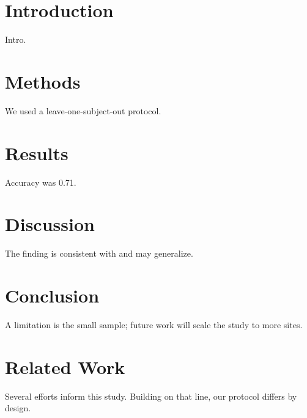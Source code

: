 \documentclass{article}
\begin{document}
\begin{abstract}
We present a subject-level protocol that closes an evaluation gap. It matters for
deployment. The method holds under stress. The work supports cautious future use.
\end{abstract}
\section{Introduction}
Intro.
\section{Methods}
We used a leave-one-subject-out protocol.
\section{Results}
Accuracy was 0.71.
\section{Discussion}
The finding is consistent with \cite{a} and may generalize.
\section{Conclusion}
A limitation is the small sample; future work will scale the study to more sites.
\section{Related Work}
Several efforts inform this study. Building on that line, our protocol differs by design.
\end{document}

